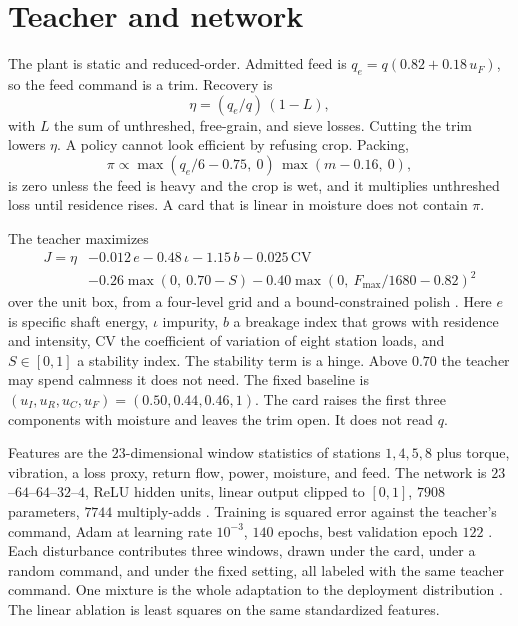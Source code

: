 \documentclass[11pt,a4paper]{article}
\begin{document}
\section{Teacher and network}

The plant is static and reduced-order. Admitted feed is \(q_e=q(0.82+0.18\,u_F)\), so the feed command is a trim. Recovery is
\begin{equation}
\eta=(q_e/q)\,(1-L),
\label{eq:eta}
\end{equation}
with \(L\) the sum of unthreshed, free-grain, and sieve losses. Cutting the trim lowers \(\eta\). A policy cannot look efficient by refusing crop. Packing,
\begin{equation}
\pi \propto \max(q_e/6-0.75,\ 0)\,\max(m-0.16,\ 0),
\label{eq:pack}
\end{equation}
is zero unless the feed is heavy and the crop is wet, and it multiplies unthreshed loss until residence rises. A card that is linear in moisture does not contain \(\pi\).

The teacher maximizes
\begin{equation}
\begin{aligned}
J=\eta&-0.012\,e-0.48\,\iota-1.15\,b-0.025\,\mathrm{CV}\\
&-0.26\max(0,\ 0.70-S)
-0.40\max(0,\ F_{\max}/1680-0.82)^2
\end{aligned}
\label{eq:J}
\end{equation}
over the unit box, from a four-level grid and a bound-constrained polish \cite{nocedal2006}. Here \(e\) is specific shaft energy, \(\iota\) impurity, \(b\) a breakage index that grows with residence and intensity, \(\mathrm{CV}\) the coefficient of variation of eight station loads, and \(S\in[0,1]\) a stability index. The stability term is a hinge. Above \(0.70\) the teacher may spend calmness it does not need. The fixed baseline is \((u_I,u_R,u_C,u_F)=(0.50,0.44,0.46,1)\). The card raises the first three components with moisture and leaves the trim open. It does not read \(q\).

Features are the \(23\)-dimensional window statistics of stations \(1,4,5,8\) plus torque, vibration, a loss proxy, return flow, power, moisture, and feed. The network is \(23\)--\(64\)--\(64\)--\(32\)--\(4\), ReLU hidden units, linear output clipped to \([0,1]\), \(7908\) parameters, \(7744\) multiply-adds \cite{goodfellow2016,he2015}. Training is squared error against the teacher's command, Adam at learning rate \(10^{-3}\), \(140\) epochs, best validation epoch \(122\) \cite{kingma2015}. Each disturbance contributes three windows, drawn under the card, under a random command, and under the fixed setting, all labeled with the same teacher command. One mixture is the whole adaptation to the deployment distribution \cite{ross2011}. The linear ablation is least squares on the same standardized features.
\end{document}

